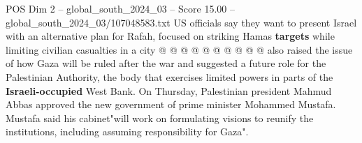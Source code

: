 \begin{textsample}{POS Dim 2 – global\_south\_2024\_03 – Score 15.00 – global\_south\_2024\_03/107048583.txt}
US officials say they want to present Israel with an alternative plan for Rafah, focused on striking Hamas \textbf{targets} while limiting civilian casualties in a city @ @ @ @ @ @ @ @ @ @ also raised the issue of how Gaza will be ruled after the war and suggested a future role for the Palestinian Authority, the body that exercises limited powers in parts of the \textbf{Israeli-occupied} West Bank.
On Thursday, Palestinian president Mahmud Abbas approved the new government of prime minister Mohammed Mustafa.
Mustafa said his cabinet"will work on formulating visions to reunify the institutions, including assuming responsibility for Gaza".

\end{textsample}
